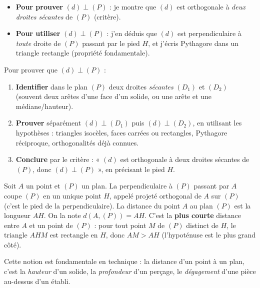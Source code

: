 \documentclass[11pt]{article}
\newcommand{\cle}[1]{{\popxbold\color{popdark}#1}}
\newcounter{popsec}
\newcounter{popsub}
\newcommand{\courssub}[1]{%
  \stepcounter{popsub}%
  \par\vspace{9pt}\noindent{\popxbold\fontsize{11.5}{13}\selectfont\color{popink}{\color{poporange}\thepopsec.\thepopsub}\hspace{6pt}#1}\par\nopagebreak\vspace{4pt}
}
\begin{document}
\begin{aretenir}
\begin{itemize}
\item \textbf{Pour prouver} $(d) \perp (P)$ : je montre que $(d)$ est orthogonale à \emph{deux droites sécantes} de $(P)$ (critère).
\item \textbf{Pour utiliser} $(d) \perp (P)$ : j'en déduis que $(d)$ est perpendiculaire à \emph{toute} droite de $(P)$ passant par le pied $H$, et j'écris Pythagore dans un triangle rectangle (propriété fondamentale).
\end{itemize}
\end{aretenir}

\begin{methode}
Pour prouver que $(d) \perp (P)$ :
\begin{enumerate}
\item \textbf{Identifier} dans le plan $(P)$ deux droites \emph{sécantes} $(D_1)$ et $(D_2)$ (souvent deux arêtes d'une face d'un solide, ou une arête et une médiane/hauteur).
\item \textbf{Prouver} séparément $(d) \perp (D_1)$ puis $(d) \perp (D_2)$, en utilisant les hypothèses : triangles isocèles, faces carrées ou rectangles, Pythagore réciproque, orthogonalités déjà connues.
\item \textbf{Conclure} par le critère : « $(d)$ est orthogonale à deux droites sécantes de $(P)$, donc $(d) \perp (P)$ », en précisant le pied $H$.
\end{enumerate}
\end{methode}

\courssub{Distance d'un point à un plan}

\begin{definition}
Soit $A$ un point et $(P)$ un plan. La perpendiculaire à $(P)$ passant par $A$ coupe $(P)$ en un unique point $H$, appelé \cle{projeté orthogonal} de $A$ sur $(P)$ (c'est le pied de la perpendiculaire).
La \cle{distance} du point $A$ au plan $(P)$ est la longueur $AH$. On la note $d(A, (P)) = AH$.
C'est la \textbf{plus courte} distance entre $A$ et un point de $(P)$ : pour tout point $M$ de $(P)$ distinct de $H$, le triangle $AHM$ est rectangle en $H$, donc $AM > AH$ (l'hypoténuse est le plus grand côté).
\end{definition}

Cette notion est fondamentale en technique : la distance d'un point à un plan, c'est la \emph{hauteur} d'un solide, la \emph{profondeur} d'un perçage, le \emph{dégagement} d'une pièce au-dessus d'un établi.
\end{document}

